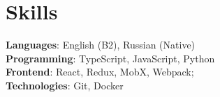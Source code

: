 \documentclass[A4,11pt]{article}
\begin{document}
\section{Skills}
\begin{itemize}[leftmargin=0.5cm, label={}]
  \small{\item{
                \textbf{Languages}{: English (B2), Russian (Native) } \\
                \textbf{Programming}{: TypeScript, JavaScript, Python } \\
                \textbf{Frontend}{: React, Redux, MobX, Webpack; } \\
                \textbf{Technologies}{: Git, Docker } \\
          }}
\end{itemize}

\end{document}
